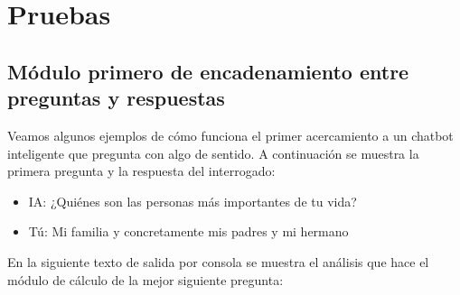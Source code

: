 \chapter{Pruebas}
\label{cap:pruebas}

\section{Módulo primero de encadenamiento entre preguntas y respuestas}
Veamos algunos ejemplos de cómo funciona el primer acercamiento a un chatbot inteligente que pregunta con algo de sentido. A continuación se muestra la primera pregunta y la respuesta del interrogado:
\begin{itemize}
	\item[] IA: ¿Quiénes son las personas más importantes de tu vida?
	\item[] Tú: Mi familia y concretamente mis padres y mi hermano
\end{itemize}

En la siguiente texto de salida por consola se muestra el análisis que hace el módulo de cálculo de la mejor siguiente pregunta:

